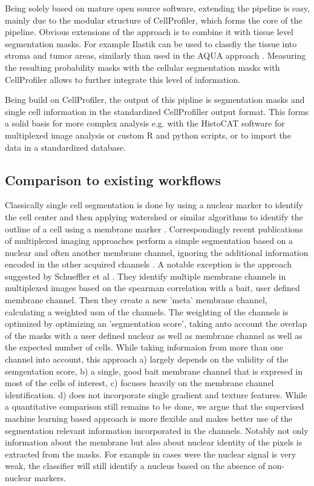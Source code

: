 \documentclass[a4paper]{article}
\begin{document}
Being solely based on mature open source software, extending the pipeline is easy, mainly due to
the modular structure of CellProfiler, which forms the core of the pipeline.
Obvious extensions of the approach is to combine it with tissue level segmentation masks.
For example Ilastik can be used to classfiy the tissue into stroma and tumor areas, similarly
than used in the AQUA approach \cite{mccabe_automated_2005}. Measuring the resulting probability masks with the
cellular segmentation masks with CellProfiler allows to further integrate this level of
information.

Being build on CellProfiler, the output of this pipline is segmentation masks and single cell information in the standardized
CellProfiller output format. This forms a solid basis for more complex analysis e.g. with the
HistoCAT software for multiplexed image analysis or custom R and python scripts, or to import the
data in a standardized database.

\subsection{Comparison to existing workflows}
Classically single cell segmentation is done by using a nuclear marker to identify the cell center
and then applying watershed or similar algorithms to identify the outline of a cell using a
membrane marker \cite{carpenter_cellprofiler:_2006}. Correspondingly recent publications of multiplexed imaging
approaches perform a simple segmentation based on a nuclear and often another membrane channel, ignoring the
additional information encoded in the other acquired channels \cite{lin_highly_2015,
angelo_multiplexed_2014}.
A notable exception is the approach suggested by Schueffler et al \cite{schuffler_automatic_2015}. They identify
multiple membrane channels in multiplexed images based on the spearman correlation with a bait, user
defined membrane channel. Then they create a new 'meta' membrane channel, calculating a weighted
usm of the channels. The weighting of the channels is optimized by optimizing an 'segmentation
score', taking anto account the overlap of the masks with a user defined nuclear as well as membrane channel as well as the expected number of
cells. While taking informaion from more than one channel into account, this approach a) largely
depends on the validity of the semgentation score, b) a single, good bait membrane channel that is expresed
in most of the cells of interest, c) focuses heavily on the membrane channel identification. d)
does not incorporate single gradient and texture features.
While a quantitative comparison still remains to be done, we argue that the supervised machine
learning based approach is more flexible and makes better use of the segmentation relevant
information incorporated in the channels. Notably not only information about the membrane but also
about nuclear identity of the pixels is extracted from the masks. For example in cases were the
nuclear signal is very weak, the classifier will still identify a nucleus based on the absence of
non-nuclear markers.
\end{document}
